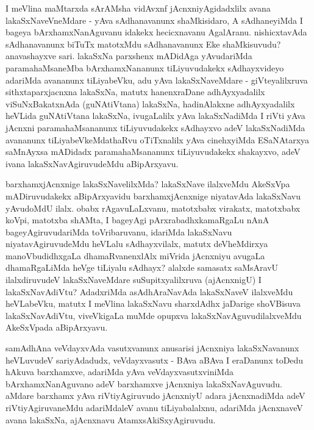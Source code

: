 \begin{artha}
I meVlina maMtarxda sArAMsha \mdash  vidAvxnf jAcnxniyAgidadxlilx avana lakaSxNaveVneMdare - yAva sAdhanavanunx shaMkisidaro, A sAdhaneyiMda I bageya bArxhamxNanAguvanu idakekx hecicxnavanu AgalAranu. nishicxtavAda sAdhanavanunx biTuTx matotxMdu sAdhanavanunx Eke shaMkisuvudu? anavashayxve sari. lakaSxNa parxshenx mADidAga yAvudariMda paramahaMsaneMba bArxhamxNananunx tiLiyuvudakekx sAdhayxvideyo adariMda avananunx tiLiyabeVku, adu yAva lakaSxNaveMdare - giVteyalilxruva sithxtaparxjacnxna lakaSxNa, matutx hanenxraDane adhAyxyadalilx viSuNxBakatxnAda (guNAtiVtana) lakaSxNa, hadinAlakxne adhAyxyadalilx heVLida guNAtiVtana lakaSxNa, ivugaLalilx yAva lakaSxNadiMda I riVti yAva jAcnxni paramahaMsananunx tiLiyuvudakekx sAdhayxvo adeV lakaSxNadiMda avananunx tiLiyabeVkeMdathaRvu oTiTxnalilx yAva cinehxyiMda ESaNAtarxya saMnAyxsa mADidadx paramahaMsananunx tiLiyuvudakekx shakayxvo, adeV ivana lakaSxNavAgiruvudeMdu aBipArxyavu.
\end{artha}

\begin{artha}
barxhamxjAcnxnige lakaSxNavelilxMda? lakaSxNave ilalxveMdu AkeSxVpa mADiruvudakekx aBipArxyavidu \mdash  barxhamxjAcnxnige niyatavAda lakaSxNavu yAvudoMdU ilalx. obabx rAgavuLaLxvanu, matotxbabx virakatx, matotxbabx koVpi, matotxba shAMta, I bageyAgi pArxrabadhxkamaRgaLu nAnA bageyAgiruvudariMda toVribaruvanu, idariMda lakaSxNavu niyatavAgiruvudeMdu heVLalu sAdhayxvilalx, matutx deVheMdirxya manoVbudidhxgaLa dhamaRvanenxlAlx miVrida jAcnxniyu avugaLa dhamaRgaLiMda heVge tiLiyalu sAdhayx? alalxde samasatx saMsAravU ilalxdiruvudeV lakaSxNaveMdare suSupitxyalilxruva (ajAcnxnigU) I lakaSxNavAdiVtu? AdadxriMda asAdhAraNavAda lakaSxNaveV ilalxveMdu heVLabeVku, matutx I meVlina lakaSxNavu sharxdAdhx jaDarige shoVBisuva lakaSxNavAdiVtu, viveVkigaLa muMde opupxva lakaSxNavAguvudilalxveMdu AkeSxVpada aBipArxyavu.
\end{artha}

\begin{artha}
samAdhAna \mdash  veVdayxvAda vasutxvanunx anusarisi jAcnxniya lakaSxNavanunx heVLuvudeV sariyAdadudx, veVdayxvasutx - BAva aBAva I eraDanunx toDedu hAkuva barxhamxve, adariMda yAva veVdayxvasutxviniMda bArxhamxNanAguvano adeV barxhamxve jAcnxniya lakaSxNavAguvudu. aMdare barxhamx yAva riVtiyAgiruvudo jAcnxniyU adara jAcnxnadiMda adeV riVtiyAgiruvaneMdu adariMdaleV avanu tiLiyabalalxnu, adariMda jAcnxnaveV avana lakaSxNa, ajAcnxnavu AtamxsAkiSxyAgiruvudu.
\end{artha}

